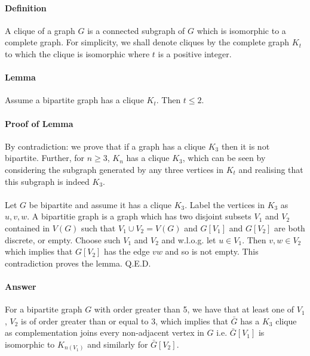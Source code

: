 \paragraph{Definition} A clique of a graph $G$ is a connected subgraph of $G$ which is
isomorphic to a complete graph. For simplicity, we shall denote cliques by the
complete graph $K_t$ to which the clique is isomorphic where $t$ is a positive integer.
\paragraph{Lemma} Assume a bipartite graph has a clique $K_t$. Then $t \leq 2$.
\paragraph{Proof of Lemma} By contradiction: we prove that if a graph has a clique
$K_3$ then it is not bipartite. Further, for $n \geq 3$, $K_n$ has a clique $K_3$, which can
be seen by considering the subgraph generated by any three vertices in $K_t$ and
realising that this subgraph is indeed $K_3$.
\paragraph{} Let $G$ be bipartite and assume it has a clique $K_3$. Label the vertices in $K_3$
as $u,v,w$. A bipartitie graph is a graph which has two disjoint subsets $V_1$ and
$V_2$ contained in $V\left(G\right)$ such that $V_1 \cup V_2 = V\left(G\right)$ and $G\left[V_1\right]$ and $G\left[V_2\right]$ are
both discrete, or empty. Choose such $V_1$ and $V_2$ and w.l.o.g. let $u \in V_1$. Then
$v,w \in V_2$ which implies that $G\left[V_2\right]$ has the edge $vw$ and so is not empty. This
contradiction proves the lemma. Q.E.D.
\paragraph{Answer}For a bipartite graph $G$ with order greater than 5, we have that at
least one of $V_1$, $V_2$ is of order greater than or equal to 3, which implies that $\bar{G}$
has a $K_3$ clique as complementation joins every non-adjacent vertex in $G$ i.e.
$\bar{G}\left[V_1\right]$ is isomorphic to $K_{n\left(V_1\right)}$ and similarly for $\bar{G}\left[V_2\right]$.
